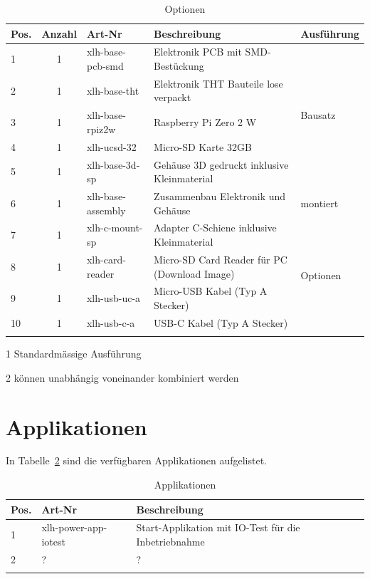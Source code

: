 \documentclass[10pt]{datasheet}
\begin{document}
\begin{table}[h]
\begin{threeparttable}
\caption{Optionen \xlhPlattformID}
    \begin{tabularx}{\textwidth}{l | c | l | l | X}

        \thickhline
        \textbf{Pos.} & \textbf{Anzahl} & \textbf{Art-Nr} & \textbf{Beschreibung} & \textbf{Ausführung} \\
        \hline
        1 & 1 & xlh-base-pcb-smd & Elektronik PCB mit SMD-Bestückung & \multirow{5}{*}{Bausatz\tnote{1}}  \\
        2 & 1 & xlh-base-tht & Elektronik THT Bauteile lose verpackt &  \\
        3 & 1 & xlh-base-rpiz2w & Raspberry Pi Zero 2 W & \\
        4 & 1 & xlh-ucsd-32 & Micro-SD Karte 32GB & \\
        5 & 1 & xlh-base-3d-sp & Gehäuse 3D gedruckt inklusive Kleinmaterial & \\
        \hline
        6 & 1 & xlh-base-assembly & Zusammenbau Elektronik und Gehäuse & montiert \\
        \hline
        7 & 1 & xlh-c-mount-sp & Adapter C-Schiene inklusive Kleinmaterial & \multirow{4}{*}{Optionen\tnote{2}} \\
        8 & 1 & xlh-card-reader & Micro-SD Card Reader für PC (Download Image) &  \\
        9 & 1 & xlh-usb-uc-a & Micro-USB Kabel (Typ A Stecker) &  \\
        10 & 1 & xlh-usb-c-a & USB-C Kabel (Typ A Stecker) &  \\
        \thickhline
    \end{tabularx}
\begin{tablenotes}
\item[1]{Standardmässige Ausführung}
\item[2]{können unabhängig voneinander kombiniert werden}
\end{tablenotes}
\label{tab:optionen}
\end{threeparttable}
\end{table}


\section{Applikationen}
In Tabelle~\ref{tab:applikationen} sind die verfügbaren Applikationen aufgelistet.

\begin{table}[h]
\begin{threeparttable}
\caption{Applikationen \xlhPlattformID}
    \begin{tabularx}{\textwidth}{l | l | l }
        \thickhline
        \textbf{Pos.} & \textbf{Art-Nr} & \textbf{Beschreibung} \\
        \hline
        1 & xlh-power-app-iotest & Start-Applikation mit IO-Test für die Inbetriebnahme \\
        2 & ? & ?  \\
        \thickhline
    \end{tabularx}

\label{tab:applikationen}
\end{threeparttable}
\end{table}
\end{document}
